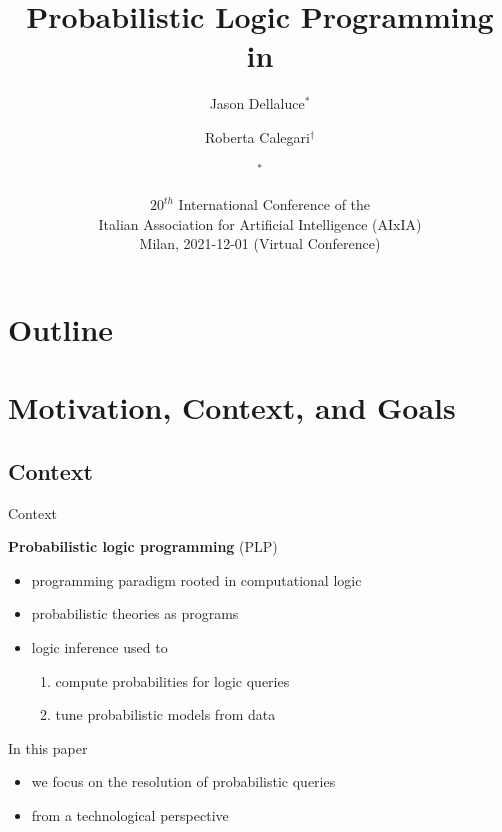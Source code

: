 \documentclass[presentation]{beamer}\mode<presentation>{\usetheme{AMSBolognaFC}}
\title[PLP in \twopkt{}]{Probabilistic Logic Programming in \twopkt{}}
\author[Dellaluce \and Calegari \and \sspeaker{Ciatto}]{
    Jason Dellaluce$^*$ \and Roberta Calegari$^\dagger$ \and \speaker{Giovanni Ciatto}$^*$
    \\\smallskip\small
    \email{jason.dellaluce@studio.unibo.it} \and \email{roberta.calegari@unibo.it} \and \speaker{\email{giovanni.ciatto@unibo.it}}
}
\institute[UniBO]{
    $^*$ \disi
    \\
    $^\dagger$ \almaai
    \\
    $^{*\dagger}$ \unibo
}
\date[AIxIA, Dec. 1, 2021]{
    $20^{th}$ International Conference of the
    \\
    Italian Association for Artificial Intelligence (AIxIA)
    \\\medskip
    Milan, 2021-12-01 (Virtual Conference)
}
\begin{document}

\frame{\titlepage}

\section*{Outline}

\frame[c]{\tableofcontents[hideallsubsections]}

\section{Motivation, Context, and Goals}

\subsection{Context}

\begin{frame}[c]{Context}
    \begin{block}{\textbf{Probabilistic logic programming} (PLP)}
        \begin{itemize}
            \item programming \alert{paradigm} rooted in computational logic
            \item \alert{probabilistic} theories as programs
            \item logic \alert{inference} used to
            \begin{enumerate}
                \item \alert{compute probabilities} for logic \alert{queries}
                \item \alert{tune} probabilistic models from \alert{data}
            \end{enumerate}
        \end{itemize}
    \end{block}
    \begin{block}{In this paper}
        \begin{itemize}
            \item we focus on the \alert{resolution} of probabilistic queries
            \item from a \alert{technological} perspective
        \end{itemize}
    \end{block}
\end{frame}
\end{document}
